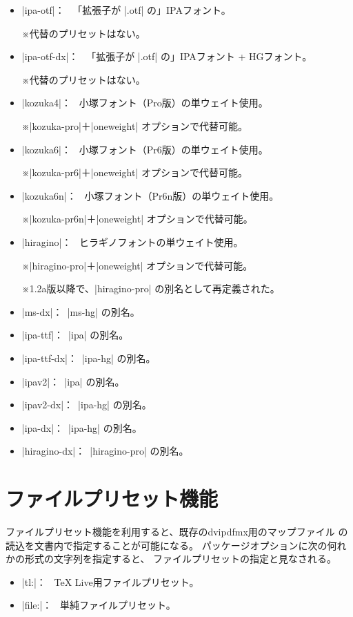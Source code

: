 \documentclass[uplatex,dvipdfmx,a4paper]{jsarticle}
\newcommand{\Note}{\par\noindent ※}
\newcommand{\Means}{：\ }
\newcommand{\Zk}{\mbox{}}
\begin{document}
\begin{itemize}
\item |ipa-otf|\Means
  「拡張子が |.otf| の」IPAフォント。
  \Note 代替のプリセットはない。
\item |ipa-otf-dx|\Means
  「拡張子が |.otf| の」IPAフォント + HGフォント。
  \Note 代替のプリセットはない。
\item |kozuka4|\Means
  小塚フォント（Pro版）の単ウェイト使用。
  \Note |kozuka-pro|＋|oneweight| オプションで代替可能。
\item |kozuka6|\Means
  小塚フォント（Pr6版）の単ウェイト使用。
  \Note |kozuka-pr6|＋|oneweight| オプションで代替可能。
\item |kozuka6n|\Means
  小塚フォント（Pr6n版）の単ウェイト使用。
  \Note |kozuka-pr6n|＋|oneweight| オプションで代替可能。
\item |hiragino|\Means
  ヒラギノフォントの単ウェイト使用。
  \Note |hiragino-pro|＋|oneweight| オプションで代替可能。
  \Note 1.2a版以降で、|hiragino-pro| の別名として再定義された。
\item |ms-dx|\Means |ms-hg| の別名。
\item |ipa-ttf|\Means |ipa| の別名。
\item |ipa-ttf-dx|\Means |ipa-hg| の別名。
\item |ipav2|\Means |ipa| の別名。
\item |ipav2-dx|\Means |ipa-hg| の別名。
\item |ipa-dx|\Means |ipa-hg| の別名。
\item |hiragino-dx|\Means |hiragino-pro| の別名。
\end{itemize}

\section{ファイルプリセット機能}
\label{sec:FilePreset}

ファイルプリセット機能を利用すると、既存のdvipdfmx用のマップファイル
の読込を文書内で指定することが可能になる。
パッケージオプションに次の何れかの形式の文字列を指定すると、
ファイルプリセットの指定と見なされる。

\begin{itemize}
\item |tl:|\Zk{}\Means
  {\TeX} Live用ファイルプリセット。
\item |file:|\Zk{}\Means
  単純ファイルプリセット。
\end{itemize}
\end{document}
